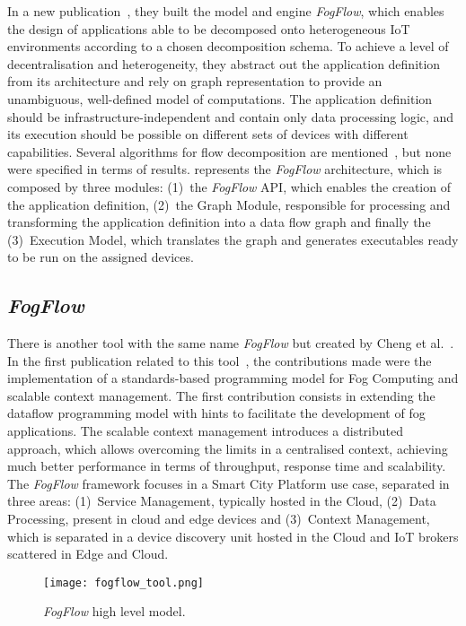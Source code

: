 In a new publication~\cite{fog_flow}, they built the model and engine \textit{FogFlow}, which enables the design of applications able to be decomposed onto heterogeneous IoT environments according to a chosen decomposition schema. To achieve a level of decentralisation and heterogeneity, they abstract out the application definition from its architecture and rely on graph representation to provide an unambiguous, well-defined model of computations. The application definition should be infrastructure-independent and contain only data processing logic, and its execution should be possible on different sets of devices with different capabilities. Several algorithms for flow decomposition are mentioned~\cite{algorithm_fog,ifogsim}, but none were specified in terms of results.  represents the \textit{FogFlow} architecture, which is composed by three modules: (1)~the \textit{FogFlow} API, which enables the creation of the application definition, (2)~the Graph Module, responsible for processing and transforming the application definition into a data flow graph and finally the (3)~Execution Model, which translates the graph and generates executables ready to be run on the assigned devices.

\subsection{\textit{FogFlow}}\label{sec:decentralized_sota_fogflow}

There is another tool with the same name \textit{FogFlow} but created by Cheng et al.~\cite{fogflow_github}. In the first publication related to this tool~\cite{fog_flow_easy}, the contributions made were the implementation of a standards-based programming model for Fog Computing and scalable context management. The first contribution consists in extending the dataflow programming model with hints to facilitate the development of fog applications. The scalable context management introduces a distributed approach, which allows overcoming the limits in a centralised context, achieving much better performance in terms of throughput, response time and scalability. The \textit{FogFlow} framework focuses in a Smart City Platform use case, separated in three areas: (1)~Service Management, typically hosted in the Cloud, (2)~Data Processing, present in cloud and edge devices and (3)~Context Management, which is separated in a device discovery unit hosted in the Cloud and IoT brokers scattered in Edge and Cloud.

\begin{figure}[h]
\centering
\texttt{[image: fogflow\_tool.png]}
\caption[\textit{FogFlow} high level model]{\textit{FogFlow} high level model\cite{fog_flow_tool}.}\label{fig:fogflow_tool}
\end{figure}


